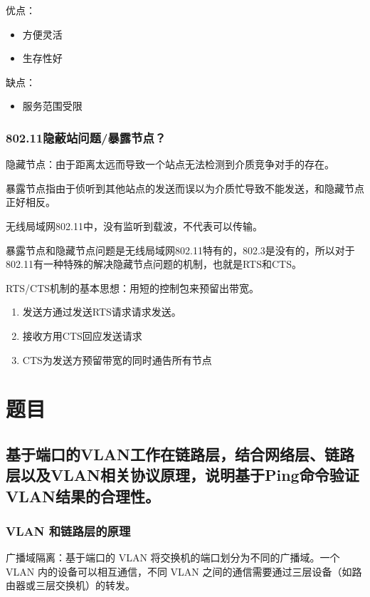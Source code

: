 \documentclass[11pt]{article}
\begin{document}
优点：
\begin{itemize}
\item 方便灵活
\item 生存性好
\end{itemize}
缺点：
\begin{itemize}
\item 服务范围受限
\end{itemize}

\subsubsection{802.11隐蔽站问题/暴露节点？}
\label{sec:org575b85e}
隐藏节点：由于距离太远而导致一个站点无法检测到介质竞争对手的存在。

暴露节点指由于侦听到其他站点的发送而误以为介质忙导致不能发送，和隐藏节点正好相反。

无线局域网802.11中，没有监听到载波，不代表可以传输。

暴露节点和隐藏节点问题是无线局域网802.11特有的，802.3是没有的，所以对于802.11有一种特殊的解决隐藏节点问题的机制，也就是RTS和CTS。

RTS/CTS机制的基本思想：用短的控制包来预留出带宽。

\begin{enumerate}
\item 发送方通过发送RTS请求请求发送。
\item 接收方用CTS回应发送请求
\item CTS为发送方预留带宽的同时通告所有节点
\end{enumerate}

\section{题目}
\label{sec:orge24cf6b}
\subsection{基于端口的VLAN工作在链路层，结合网络层、链路层以及VLAN相关协议原理，说明基于Ping命令验证VLAN结果的合理性。}
\label{sec:org12f44f0}

\subsubsection{VLAN 和链路层的原理}
\label{sec:org4b858cb}

广播域隔离：基于端口的 VLAN 将交换机的端口划分为不同的广播域。一个 VLAN 内的设备可以相互通信，不同 VLAN 之间的通信需要通过三层设备（如路由器或三层交换机）的转发。
\end{document}
